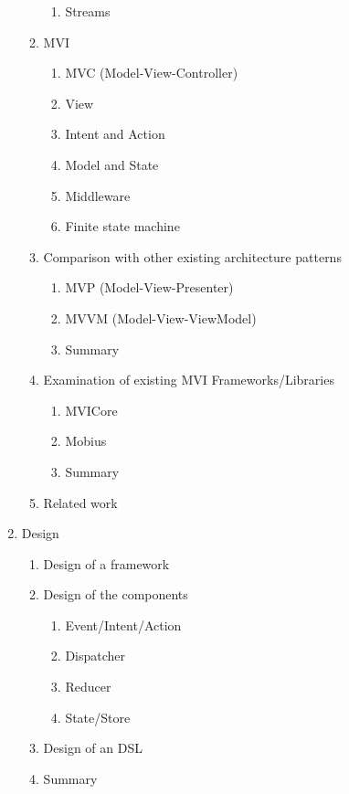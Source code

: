 \begin{enumerate}
\begin{enumerate}
\begin{enumerate}
            \item Streams
        \end{enumerate}
        \item MVI
        \begin{enumerate}
            \item MVC (Model-View-Controller)
            \item View
            \item Intent and Action
            \item Model and State
            \item Middleware
            \item Finite state machine
        \end{enumerate}
        \item Comparison with other existing architecture patterns
        \begin{enumerate}
            \item MVP (Model-View-Presenter)
            \item MVVM (Model-View-ViewModel)
            \item Summary
        \end{enumerate}
        \item Examination of existing  MVI Frameworks/Libraries
        \begin{enumerate}
            \item MVICore
            \item Mobius
            \item Summary
        \end{enumerate}
        \item Related work
    \end{enumerate}
    \item Design
    \begin{enumerate}
        \item Design of a framework
        \item Design of the components
        \begin{enumerate}
            \item Event/Intent/Action
            \item Dispatcher
            \item Reducer
            \item State/Store
        \end{enumerate}
        \item Design of an DSL
        \item Summary

\end{enumerate}
\end{enumerate}
